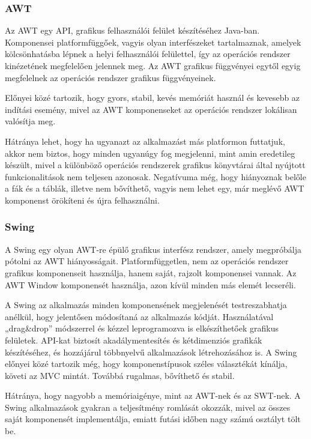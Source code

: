 \subsubsection*{AWT} 

Az AWT egy API, grafikus felhasználói felület készítéséhez Java-ban. \cite{gui, awt}
Komponensei platformfüggőek, vagyis olyan interfészeket tartalmaznak, amelyek kölcsönhatásba lépnek a helyi felhasználói felülettel, így az operációs rendszer kinézetének megfelelően jelennek meg.
Az AWT grafikus függvényei egytől egyig megfelelnek az operációs rendszer grafikus függvényeinek.

Előnyei közé tartozik, hogy gyors, stabil, kevés memóriát használ és kevesebb az indítási esemény, mivel az AWT komponenseket az operációs rendszer lokálisan valósítja meg.

Hátránya lehet, hogy ha ugyanazt az alkalmazást más platformon futtatjuk, akkor nem biztos, hogy minden ugyanúgy fog megjelenni, mint amin eredetileg készült, mivel a különböző operációs rendszerek grafikus könyvtárai által nyújtott funkcionalitások nem teljesen azonosak.
Negatívuma még, hogy hiányoznak belőle a fák és a táblák, illetve nem bővíthető, vagyis nem lehet egy, már meglévő AWT komponenst örökíteni és újra felhasználni.


\subsubsection*{Swing}

A Swing egy olyan AWT-re épülő grafikus interfész rendszer, amely megpróbálja pótolni az AWT hiányosságait.\cite{gui, swing}
Platformfüggetlen, nem az operációs rendszer grafikus komponenseit használja, hanem saját, rajzolt komponensei vannak.
Az AWT Window komponensét használja, azon kívül minden más elemét lecseréli.

A Swing az alkalmazás minden komponensének megjelenését testreszabhatja anélkül, hogy jelentősen módosítaná az alkalmazás kódját.
Használatával „drag\&drop”  módszerrel és kézzel leprogramozva is elkészíthetőek grafikus felületek.
API-kat biztosít akadálymentesítés és kétdimenziós grafikák készítéséhez, és hozzájárul többnyelvű alkalmazások létrehozásához is.
A Swing előnyei közé tartozik még, hogy komponenstípusok széles választékát kínálja, követi az MVC mintát.
Továbbá rugalmas, bővíthető és stabil.

Hátránya, hogy nagyobb a memóriaigénye, mint az AWT-nek és az SWT-nek.
A Swing alkalmazások gyakran a teljesítmény romlását okozzák, mivel az összes saját komponensét implementálja, emiatt futási időben nagy számú osztályt tölt be.


